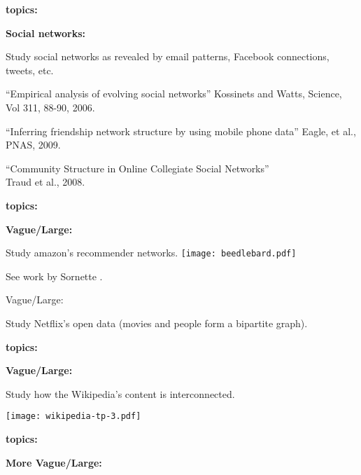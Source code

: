 
  \textbf{topics:}

  \textbf{Social networks:}
  
  
    Study social networks as revealed
    by email patterns, Facebook connections, tweets, etc.
  
    ``Empirical analysis of evolving social networks''
    Kossinets and Watts, Science, Vol 311, 88-90, 2006.\cite{kossinets2006a}
  
    ``Inferring friendship network structure by using mobile phone data''
    Eagle, et al., PNAS, 2009.
  
    ``Community Structure in Online Collegiate Social Networks''\\
    Traud et al., 2008.\\
  
  



      \textbf{topics:}

    \textbf{Vague/Large:}
      
      
        Study amazon's recommender
        networks.
        \texttt{[image: beedlebard.pdf]}

        See work by Sornette \etal.
      
        Vague/Large:

        Study Netflix's open data
        (movies and people form a bipartite graph).
      
    




  \textbf{topics:}

  \textbf{Vague/Large:}
  
  
    Study how the Wikipedia's
    content is interconnected.

    \bigskip
    \texttt{[image: wikipedia-tp-3.pdf]}
  
  




  \textbf{topics:}

  \textbf{More Vague/Large:}
    
